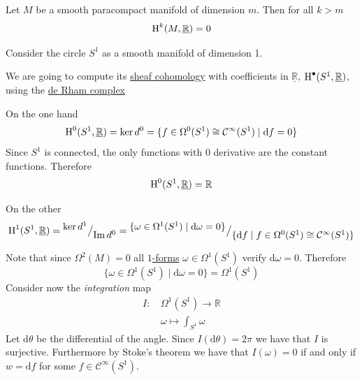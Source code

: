\documentclass[../../main]{subfiles}
\begin{document}
\begin{corollary}
  Let \(M\) be a smooth paracompact manifold of dimension \(m\).
  Then for all \(k > m\)
  \begin{equation*}
    \operatorname{H}^{k}(M, \underline{\mathbb{R}}) = 0
  \end{equation*}
\end{corollary}

\begin{example}
  Consider the circle \(S^{1}\) as a smooth manifold of dimension 1.

  We are going to compute its \hyperref[def:sheaf-cohomology]{sheaf cohomology} with coefficients in \(\underline{\mathbb{R}}\), \(\operatorname{H}^{\bullet}(S^{1}, \underline{\mathbb{R}})\), using the \hyperref[def:de-rham-complex]{de Rham complex}
  \begin{center}
  \end{center}

  On the one hand
  \begin{equation*}
    \operatorname{H}^{0}(S^{1}, \underline{\mathbb{R}}) = \ker d^{0} = \{f \in \Omega^{0}(S^{1}) \cong \mathcal{C}^{\infty}(S^{1}) \mid \mathrm{d}f = 0\}
  \end{equation*}
  Since \(S^{1}\) is connected, the only functions with 0 derivative are the constant functions.
  Therefore
  \begin{equation*}
    \operatorname{H}^{0}(S^{1}, \underline{\mathbb{R}}) = \mathbb{R}
  \end{equation*}

  On the other
  \begin{equation*}
    \operatorname{H}^{1}(S^{1}, \underline{\mathbb{R}}) = {^{\textstyle \ker d^{1}}\big/_{\textstyle \operatorname*{Im} d^{0}}} = {^{\textstyle \{\omega \in \Omega^{1}(S^{1}) \mid \mathrm{d}\omega = 0\}}\big/_{\textstyle \{\mathrm{d}f \mid f \in \Omega^{0}(S^{1}) \cong \mathcal{C}^{\infty}(S^{1})\}}}
  \end{equation*}

  Note that since \(\Omega^{2}(M) = 0\) all \hyperref[def:smooth-k-form]{\(1\)-forms} \(\omega \in \Omega^{1}(S^{1})\) verify \(\mathrm{d}\omega = 0\).
  Therefore
  \begin{equation*}
    \{\omega \in \Omega^{1}(S^{1}) \mid \mathrm{d}\omega = 0\} = \Omega^{1}(S^{1})
  \end{equation*}
  Consider now the \textit{integration} map
  \begin{align*}
    I:\,& \Omega^{1}(S^{1}) \to \mathbb{R} \\
        & \omega \mapsto \int_{S^{1}} \omega 
  \end{align*}
  Let \(\mathrm{d}\theta\) be the differential of the angle.
  Since \(I(\mathrm{d}\theta) = 2\pi\) we have that \(I\) is surjective.
  Furthermore by Stoke's theorem we have that \(I(\omega) = 0\) if and only if \(w = \mathrm{d}f\) for some \(f \in \mathcal{C}^{\infty}(S^{1})\).


\end{example}
\end{document}
